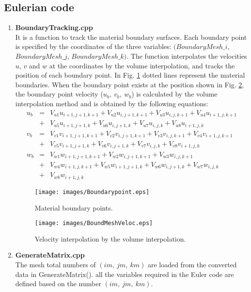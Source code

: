 %

\subsection{Eulerian code}
\begin{enumerate}
\item {\bf BoundaryTracking.cpp}\\
It is a function to track the material boundary surfaces. Each boundary point is specified by the coordinates of the three variables: $( BoundaryMesh\_i$,  $BoundaryMesh\_j$, $BoundaryMesh\_k )$. The function interpolates the velocities $u$, $v$ and $w$ at the coordinates by the volume interpolation, and tracks the position of each boundary point. In Fig. \ref {BP} dotted lines represent the material boundaries. When the boundary point exists at the position shown in Fig. \ref {BMV}, the boundary point velocity ($u_b, \ v_b, \ w_b$) is calculated by the volume interpolation method and is obtained by the following equations:
	\begin{eqnarray}
		u_b&=&V_{u1}u_{i+1,j+1,k+1}+V_{u2}u_{i,j+1,k+1}+V_{u3}u_{i,j,k+1}+V_{u4}u_{i+1,j,k+1} \\ \nonumber 
		&+&V_{u5}u_{i+1,j+1,k}+V_{u6}u_{i,j+1,k}+V_{u7}u_{i,j,k}+V_{u8}u_{i+1,j,k}\\
		v_b&=&V_{v1}v_{i+1,j+1,k+1}+V_{v2}v_{i,j+1,k+1}+V_{v3}v_{i,j,k+1}+V_{v4}v_{i+1,j,k+1} \\ \nonumber
		&+&V_{v5}v_{i+1,j+1,k}+V_{v6}v_{i,j+1,k}+V_{v7}v_{i,j,k}+V_{v8}v_{i+1,j,k}\\
		w_b&=&V_{w1}w_{i+1,j+1,k+1}+V_{w2}w_{i,j+1,k+1}+V_{w3}w_{i,j,k+1}\\ \nonumber
	 &+&V_{w4}w_{i+1,j,k+1} +V_{w5}w_{i+1,j+1,k}+V_{w6}w_{i,j+1,k}+V_{w7}w_{i,j,k}\\ \nonumber
	 &+&V_{w8}w_{i+1,j,k}
	\end{eqnarray}

	\begin{figure}[H]
		\centering
		\texttt{[image: images/Boundarypoint.eps]}
		\caption{Material boundary points.}\label{BP}
	\end{figure}
	\begin{figure}[H]
		\centering
		\texttt{[image: images/BoundMeshVeloc.eps]}
		\caption{Velocity interpolation by the volume interpolation.}\label{BMV}
	\end{figure}
	
\item {\bf GenerateMatrix.cpp}\\
The mesh total numbers of $(im,\ jm,\ km)$ are loaded from the converted data in GenerateMatrix(). all the variables required  in the Euler code are defined based on the number $(im,\ jm,\ km)$. 


\end{enumerate}
